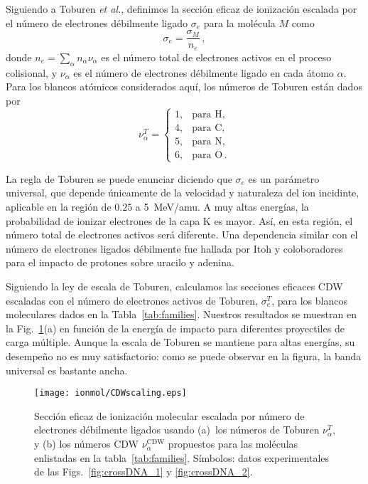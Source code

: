Siguiendo a Toburen \textit{et al.}, definimos la sección eficaz de 
ionización escalada por el número de electrones débilmente ligado 
$\sigma_e$ para la molécula $M$ como
\begin{equation}
\sigma_e=\frac{\sigma_M}{n_e}\,, 
\label{eq:cross-ne} 
\end{equation}
donde $n_e=\sum_{\alpha}n_{\alpha}\nu_{\alpha}$ es el número total de 
electrones activos en el proceso colisional, y $\nu_{\alpha}$ es el 
número de electrones débilmente ligado en cada átomo $\alpha$. Para los 
blancos atómicos considerados aquí, los números de Toburen están dados 
por 
\begin{equation}
\nu_{\alpha}^T=\left\{ 
\begin{array}{ll}
1, & \text{para H,} \\
4, & \text{para C,} \\ 
5, & \text{para N,} \\ 
6, & \text{para O}\,.
\end{array}\right.
\label{eq:neToburen} 
\end{equation} 

La regla de Toburen se puede enunciar diciendo que $\sigma_{e}$ es un 
parámetro universal, que depende únicamente de la velocidad y naturaleza
del ion incidinte, aplicable en la región de $0.25$ a 5~MeV/amu. A 
muy altas energías, la probabilidad de ionizar electrones de la capa K 
es mayor. Así, en esta región, el número total de electrones activos 
será diferente. Una dependencia similar con el número de electrones 
ligados débilmente fue hallada por Itoh y coloboradores~\cite{itoh2013} 
para el impacto de protones sobre uracilo y adenina.

Siguiendo la ley de escala de Toburen, calculamos las secciones eficaces 
CDW escaladas con el número de electrones activos de Toburen, 
$\sigma_{e}^T$, para los blancos moleculares dados en la 
Tabla~\ref{tab:families}. Nuestros resultados se muestran en la 
Fig.~\ref{fig:newscaling}(a) en función de la energía de impacto para 
diferentes proyectiles de carga múltiple. Aunque la escala de Toburen se 
mantiene para altas energías, su desempeño no es muy satisfactorio: como 
se puede observar en la figura, la banda universal es bastante ancha.

\begin{figure}[t]
\centering
\texttt{[image: ionmol/CDWscaling.eps]}
\caption[Sección eficaz de ionización molecular escalada por $n_e$.]
{Sección eficaz de ionización molecular escalada por número de electrones 
débilmente ligados usando (a)~los números de Toburen $\nu_{\alpha}^T$, y 
(b) los números CDW $\nu_{\alpha}^{\text{CDW}}$ propuestos para las 
moléculas enlistadas en la tabla~\ref{tab:families}. Símbolos: 
datos experimentales de las Figs.~\ref{fig:crossDNA_1} y 
\ref{fig:crossDNA_2}.}
\label{fig:newscaling}
\end{figure}

